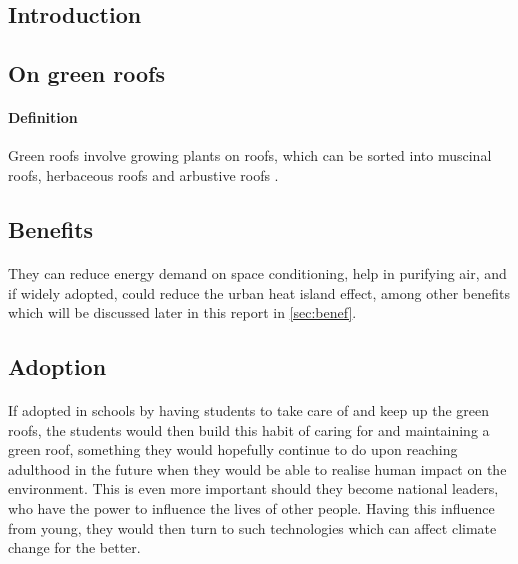 \documentclass{article}
\begin{document}
\newpage

\tableofcontents
\newpage

\begin{multicols}{2}

  \section{Introduction}
  \subsection{On green roofs}
  \paragraph{Definition} Green roofs involve growing plants on roofs,
  which can be sorted into muscinal roofs, herbaceous roofs and arbustive
  roofs \parencite{ecoeng}.


  \subsection{Benefits}
  \paragraph{} They can reduce energy demand on space conditioning,
  help in purifying air, and if widely adopted, could reduce the urban
  heat island effect, among other benefits \parencite{energeff} which will
  be discussed later in this report in \autoref{sec:benef}.


  \subsection{Adoption}
  \paragraph{} If adopted in schools by having students to take care
  of and keep up the green roofs, the students would then build this
  habit of caring for and maintaining a green roof, something they would
  hopefully continue to do upon reaching adulthood in the future when
  they would be able to realise human impact on the environment. This is
  even more important should they become national leaders, who have the
  power to influence the lives of other people. Having this influence
  from young, they would then turn to such technologies which can affect
  climate change for the better.


\end{multicols}
\end{document}
